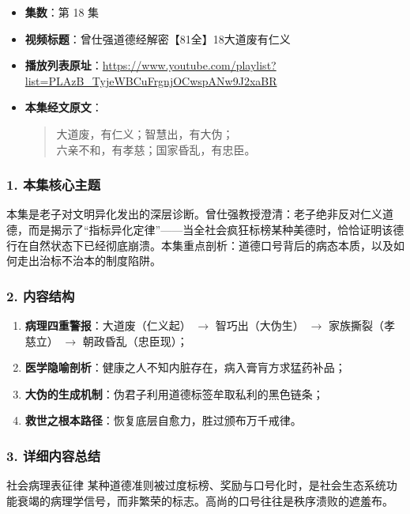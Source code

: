 \begin{itemize}
    \item \textbf{集数}：第 18 集
    \item \textbf{视频标题}：曾仕强道德经解密【81全】18大道废有仁义
    \item \textbf{播放列表原址}：\url{https://www.youtube.com/playlist?list=PLAzB_TyjeWBCuFrgnjOCwspANw9J2xaBR}
    \item \textbf{本集经文原文}：
    \begin{quote}\kaishu
    大道废，有仁义；智慧出，有大伪；\\
    六亲不和，有孝慈；国家昏乱，有忠臣。
    \end{quote}
\end{itemize}

\subsubsection{1. 本集核心主题}
本集是老子对文明异化发出的深层诊断。曾仕强教授澄清：老子绝非反对仁义道德，而是揭示了“指标异化定律”——当全社会疯狂标榜某种美德时，恰恰证明该德行在自然状态下已经彻底崩溃。本集重点剖析：道德口号背后的病态本质，以及如何走出治标不治本的制度陷阱。

\subsubsection{2. 内容结构}
\begin{enumerate}
    \item \textbf{病理四重警报}：大道废（仁义起） $\rightarrow$ 智巧出（大伪生） $\rightarrow$ 家族撕裂（孝慈立） $\rightarrow$ 朝政昏乱（忠臣现）；
    \item \textbf{医学隐喻剖析}：健康之人不知内脏存在，病入膏肓方求猛药补品；
    \item \textbf{大伪的生成机制}：伪君子利用道德标签牟取私利的黑色链条；
    \item \textbf{救世之根本路径}：恢复底层自愈力，胜过颁布万千戒律。
\end{enumerate}

\subsubsection{3. 详细内容总结}

\begin{ConceptBox}{社会病理表征律}
某种道德准则被过度标榜、奖励与口号化时，是社会生态系统功能衰竭的病理学信号，而非繁荣的标志。高尚的口号往往是秩序溃败的遮羞布。
\end{ConceptBox}

